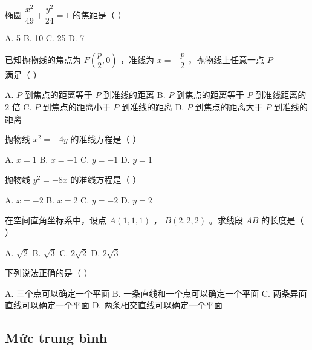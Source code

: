 \documentclass[11pt, a4paper]{article}
\begin{document}
\begin{baitap}[1]
椭圆 $\dfrac{x^2}{49} + \dfrac{y^2}{24} = 1$ 的焦距是（ ）
\par\vspace{3pt}
\noindent A. 5 \quad B. 10 \quad C. 25 \quad D. 7
\end{baitap}
\begin{baitap}[2]
已知抛物线的焦点为 $F\left(\dfrac{p}{2}, 0\right)$ ，准线为 $x = -\dfrac{p}{2}$ ，抛物线上任意一点 $P$ 满足（ ）
\par\vspace{3pt}
\noindent A. $P$ 到焦点的距离等于 $P$ 到准线的距离 \quad B. $P$ 到焦点的距离等于 $P$ 到准线距离的 $2$ 倍 \quad C. $P$ 到焦点的距离小于 $P$ 到准线的距离 \quad D. $P$ 到焦点的距离大于 $P$ 到准线的距离
\end{baitap}
\begin{baitap}[3]
抛物线 $x^2 = -4y$ 的准线方程是（ ）
\par\vspace{3pt}
\noindent A. $x = 1$ \quad B. $x = -1$ \quad C. $y = -1$ \quad D. $y = 1$
\end{baitap}
\begin{baitap}[4]
抛物线 $y^2 = -8x$ 的准线方程是（ ）
\par\vspace{3pt}
\noindent A. $x = -2$ \quad B. $x = 2$ \quad C. $y = -2$ \quad D. $y = 2$
\end{baitap}
\begin{baitap}[5]
在空间直角坐标系中，设点 $A(1,1,1)$ ， $B(2,2,2)$ 。求线段 $AB$ 的长度是（ ）
\par\vspace{3pt}
\noindent A. $\sqrt{2}$ \quad B. $\sqrt{3}$ \quad C. $2\sqrt{2}$ \quad D. $2\sqrt{3}$
\end{baitap}
\begin{baitap}[6]
下列说法正确的是（ ）
\par\vspace{3pt}
\noindent A. 三个点可以确定一个平面 \quad B. 一条直线和一个点可以确定一个平面 \quad C. 两条异面直线可以确定一个平面 \quad D. 两条相交直线可以确定一个平面
\end{baitap}
\subsection{Mức trung bình}
\end{document}
